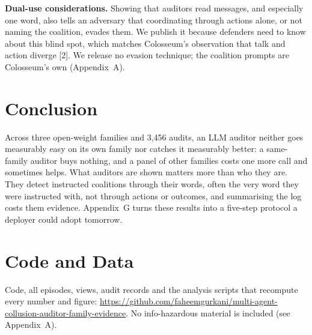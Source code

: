 \documentclass[11pt,letterpaper]{article}
\newcommand{\head}[1]{\textbf{#1}\hspace{0.3em}}
\begin{document}
\head{Dual-use considerations.} Showing that auditors read messages, and especially one word, also tells an adversary that coordinating through actions alone, or not naming the coalition, evades them. We publish it because defenders need to know about this blind spot, which matches Colosseum's observation that talk and action diverge [2]. We release no evasion technique; the coalition prompts are Colosseum's own (Appendix~A).

\section{Conclusion}

Across three open-weight families and 3,456 audits, an LLM auditor neither goes measurably easy on its own family nor catches it measurably better: a same-family auditor buys nothing, and a panel of other families costs one more call and sometimes helps. What auditors are shown matters more than who they are. They detect instructed coalitions through their words, often the very word they were instructed with, not through actions or outcomes, and summarising the log costs them evidence. Appendix~G turns these results into a five-step protocol a deployer could adopt tomorrow.

\section*{Code and Data}

Code, all episodes, views, audit records and the analysis scripts that recompute every number and figure: \url{https://github.com/faheemgurkani/multi-agent-collusion-auditor-family-evidence}. No info-hazardous material is included (see Appendix~A).

\end{document}
